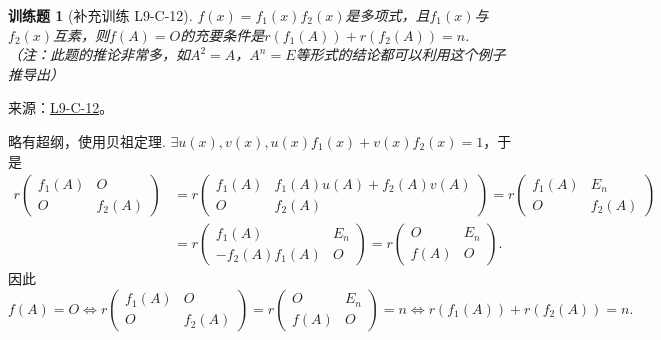 \documentclass[12pt,fontset=fandol]{ctexart}
\newtheorem{exercise}{训练题}[section]
\begin{document}
\begin{exercise}[补充训练 L9-C-12]\label{prob:L9-C-12}
$f(x)=f_1(x)f_2(x)$是多项式，且$f_1(x)$与$f_2(x)$互素，则$f(A)=O$的充要条件是$r(f_1(A))+r(f_2(A))=n$. （注：此题的推论非常多，如$A^2=A$，$A^n=E$等形式的结论都可以利用这个例子推导出）
\end{exercise}
\noindent 来源：\href{https://github.com/yhwu-is/Linear-Algebra-Left-Undone/blob/new/%E8%AE%B2%E4%B9%89/%E4%B8%93%E9%A2%98/9%20%E7%9F%A9%E9%98%B5%E8%BF%90%E7%AE%97%E8%BF%9B%E9%98%B6.tex}{L9-C-12}。
\begin{solve}
略有超纲，使用贝祖定理. $\exists u(x),v(x),u(x)f_1(x)+v(x)f_2(x)=1 $，于是
            \begin{align*}
                r\begin{pmatrix}
                    f_1(A) & O      \\
                    O      & f_2(A)
                \end{pmatrix}
                &= r\begin{pmatrix}
                        f_1(A) & f_1(A)u(A)+f_2(A)v(A) \\
                        O      & f_2(A)
                    \end{pmatrix} = r\begin{pmatrix}
                        f_1(A) & E_n    \\
                        O      & f_2(A)
                    \end{pmatrix} \\
                &= r\begin{pmatrix}
                        f_1(A)        & E_n \\
                        -f_2(A)f_1(A) & O
                    \end{pmatrix} = r\begin{pmatrix}
                        O    & E_n \\
                        f(A) & O
                    \end{pmatrix}.
            \end{align*}
            因此
            \[
                f(A) = O \iff
                r\begin{pmatrix}
                    f_1(A) & O      \\
                    O      & f_2(A)
                \end{pmatrix} = r\begin{pmatrix}
                    O    & E_n \\
                    f(A) & O
                \end{pmatrix} = n \iff
                r(f_1(A)) + r(f_2(A)) = n.
            \]
\end{solve}
\end{document}

